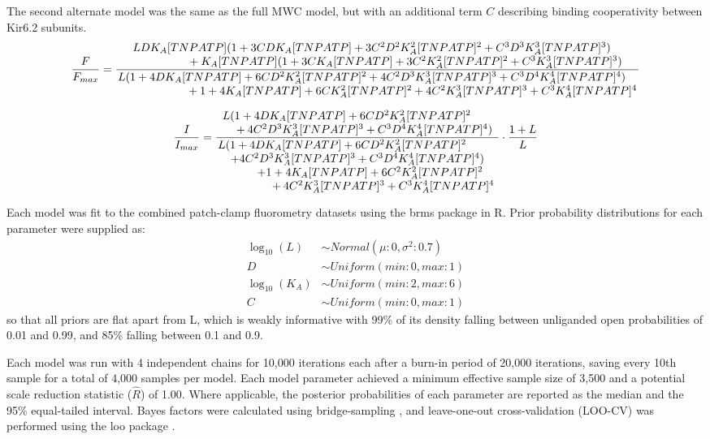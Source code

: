\documentclass[9pt,lineno, onehalfspacing]{elife_modified}
\begin{document}
The second alternate model was the same as the full MWC model, but with an additional term $C$ describing binding cooperativity between Kir6.2 subunits.
\begin{equation} \label{eq:binding_3}
\frac{F}{F_{max}} = \frac{\splitfrac
    {LDK_A[TNPATP](1+3CDK_A[TNPATP]+3C^2D^2K_A^2[TNPATP]^2+C^3D^3K_A^3[TNPATP]^3)}
    {+K_A[TNPATP](1+3CK_A[TNPATP]+3C^2K_A^2[TNPATP]^2+C^3K_A^3[TNPATP]^3)}}{\splitfrac
    {L(1+4DK_A[TNPATP]+6CD^2K_A^2[TNPATP]^2+4C^2D^3K_A^3[TNPATP]^3+C^3D^4K_A^4[TNPATP]^4)}
    {+1+4K_A[TNPATP]+6CK_A^2[TNPATP]^2+4C^2K_A^3[TNPATP]^3+C^3K_A^4[TNPATP]^4}}
\end{equation}

\begin{equation} \label{eq:gating_3}
\frac{I}{I_{max}} = \frac{\splitfrac
    {L(1+4DK_A[TNPATP]+6CD^2K_A^2[TNPATP]^2}
    {+4C^2D^3K_A^3[TNPATP]^3+C^3D^4K_A^4[TNPATP]^4)}}{\splitfrac
    {L(1+4DK_A[TNPATP]+6CD^2K_A^2[TNPATP]^2}{\splitfrac
    {+4C^2D^3K_A^3[TNPATP]^3+C^3D^4K_A^4[TNPATP]^4)}{\splitfrac
    {+1+4K_A[TNPATP]+6C^2K_A^2[TNPATP]^2}
    {+4C^2K_A^3[TNPATP]^3+C^3K_A^4[TNPATP]^4}}}}\cdot
   \frac
    {1+L}
    {L}
\end{equation}

Each model was fit to the combined patch-clamp fluorometry datasets using the brms package \citep{RN109, RN108} in R.
Prior probability distributions for each parameter were supplied as:
\begin{equation} \label{eq:priors}
\begin{aligned}
\log_{10}(L) &\sim Normal(\mu:0, \sigma^2:0.7) \\
D &\sim Uniform(min:0, max:1) \\
\log_{10}(K_A) &\sim Uniform(min:2, max:6) \\
C &\sim Uniform(min:0, max:1)
\end{aligned}
\end{equation}
so that all priors are flat apart from L, which is weakly informative with 99\% of its density falling between unliganded open probabilities of 0.01 and 0.99, and 85\% falling between 0.1 and 0.9.

Each model was run with 4 independent chains for 10,000 iterations each after a burn-in period of 20,000 iterations, saving every 10th sample for a total of 4,000 samples per model.
Each model parameter achieved a minimum effective sample size of 3,500 and a potential scale reduction statistic ($\hat{R}$) of 1.00.
Where applicable, the posterior probabilities of each parameter are reported as the median and the 95\% equal-tailed interval.
Bayes factors were calculated using bridge-sampling \citep{RN104}, and leave-one-out cross-validation (LOO-CV) was performed using the loo package \citep{RN110}.
\end{document}
